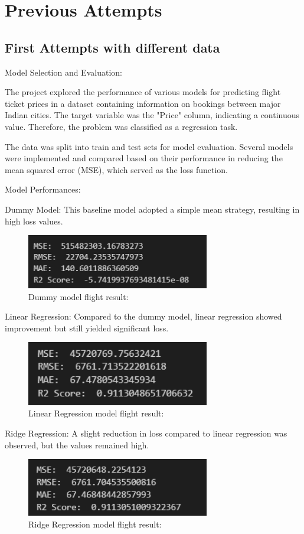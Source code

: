 \documentclass{article}
\begin{document}
\section{Previous Attempts}
\subsection{First Attempts with different data}
Model Selection and Evaluation:

The project explored the performance of various models for predicting flight ticket prices in a dataset containing information on bookings between major Indian cities. The target variable was the "Price" column, indicating a continuous value. Therefore, the problem was classified as a regression task.

The data was split into train and test sets for model evaluation. Several models were implemented and compared based on their performance in reducing the mean squared error (MSE), which served as the loss function.

Model Performances:


Dummy Model: This baseline model adopted a simple mean strategy, resulting in high loss values.
\begin{figure}[H]
    \caption{Dummy model flight result:}
    \centering
    \includegraphics[width=8cm]{imgFolder/dummyModelFlight.png}
\end{figure}

Linear Regression: Compared to the dummy model, linear regression showed improvement but still yielded significant loss.
\begin{figure}[H]
    \caption{Linear Regression model flight result:}
    \centering
    \includegraphics[width=8cm]{imgFolder/linearRegressionFlight.png}
\end{figure}

Ridge Regression: A slight reduction in loss compared to linear regression was observed, but the values remained high.
\begin{figure}[H]
    \caption{Ridge Regression model flight result:}
    \centering
    \includegraphics[width=8cm]{imgFolder/ridgeRegressionFlight.png}
\end{figure}
\end{document}
